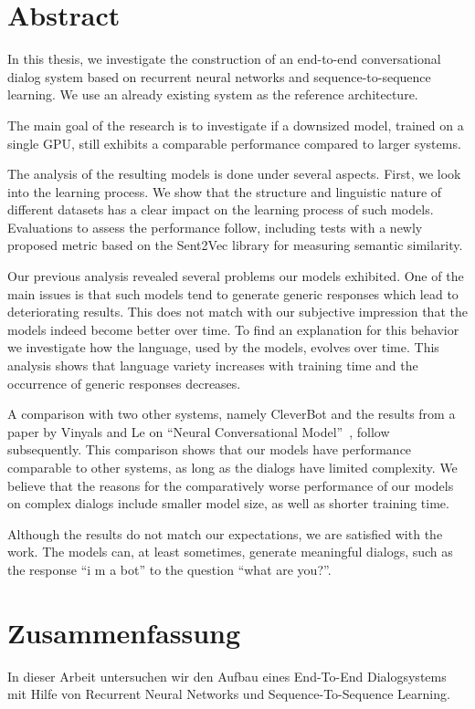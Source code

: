 \chapter*{Abstract}
In this thesis, we investigate the construction of an end-to-end conversational dialog system based on recurrent neural networks and sequence-to-sequence learning. We use an already existing system as the reference architecture. 

The main goal of the research is to investigate if a downsized model, trained on a single GPU, still exhibits a comparable performance compared to larger systems.

The analysis of the resulting models is done under several aspects. First, we look into the learning process. We show that the structure and linguistic nature of different datasets has a clear impact on the learning process of such models. Evaluations to assess the performance follow, including tests with a newly proposed metric based on the Sent2Vec library for measuring semantic similarity.

Our previous analysis revealed several problems our models exhibited. One of the main issues is that such models tend to generate generic responses which lead to deteriorating results. This does not match with our subjective impression that the models indeed become better over time. To find an explanation for this behavior we investigate how the language, used by the models, evolves over time. This analysis shows that language variety increases with training time and the occurrence of generic responses decreases.

A comparison with two other systems, namely CleverBot and the results from a paper by Vinyals and Le on ``Neural Conversational Model''~\cite{Vinyals:2015}, follow subsequently. This comparison shows that our models have performance comparable to other systems, as long as the dialogs have limited complexity. We believe that the reasons for the comparatively worse performance of our models on complex dialogs include smaller model size, as well as shorter training time.

Although the results do not match our expectations, we are satisfied with the work. The models can, at least sometimes, generate meaningful dialogs, such as the response ``i m a bot'' to the question ``what are you?''.

\chapter*{Zusammenfassung}
In dieser Arbeit untersuchen wir den Aufbau eines End-To-End Dialogsystems mit Hilfe von Recurrent Neural Networks und Sequence-To-Sequence Learning.

